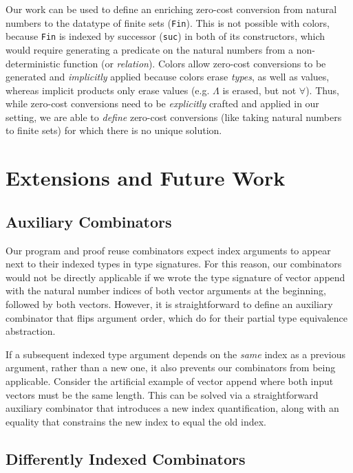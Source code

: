 \documentclass[acmsmall,screen]{acmart}
\newcommand{\labsec}[1]{\label{sec:#1}}
\begin{document}
Our work can be used to define an enriching zero-cost conversion
from natural numbers to the datatype of
finite sets (\texttt{Fin}). This is not possible with colors, because
\texttt{Fin} is indexed by successor (\texttt{suc}) in both of its
constructors, which would require generating a predicate on the
natural numbers from a non-deterministic function (or
\textit{relation}). Colors allow zero-cost conversions to be
generated and \textit{implicitly} applied because colors erase \textit{types}, as
well as values, whereas implicit products only erase values
(e.g. $\Lambda$ is erased, but not $\forall$).
Thus, while zero-cost conversions
need to be \textit{explicitly} crafted and applied in our setting, we
are able to \textit{define} zero-cost conversions (like taking natural numbers to
finite sets) for which there is no unique solution.


\section{Extensions and Future Work}
\labsec{future}

\subsection{Auxiliary Combinators}

Our program and proof reuse combinators expect index arguments to
appear next to their indexed types in type signatures. For this
reason, our combinators would not be directly applicable if we wrote
the type signature of vector append with the natural number indices of
both vector arguments at the beginning, followed by both
vectors. However, it is straightforward to define an auxiliary combinator that
flips argument order, which \citet{dagand:interop} do for their
partial type equivalence abstraction.

If a subsequent indexed type argument depends on the \textit{same}
index as a previous argument, rather than a new one, it also prevents
our combinators from being applicable. Consider the
artificial example of vector append where both input vectors must be
the same length. This can be solved via a
straightforward auxiliary combinator that introduces a new index quantification,
along with an equality that constrains the new index to equal the old index.

\subsection{Differently Indexed Combinators}
\end{document}
